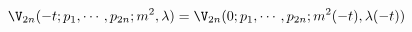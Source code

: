 \begin{equation}
\V_{2n} (-t; p_1,\cdots, p_{2n}; m^2, \lambda) = \V_{2n} (0;
p_1,\cdots,p_{2n}; m^2 (-t), \lambda (-t)) \label{altscaling}
\end{equation}

